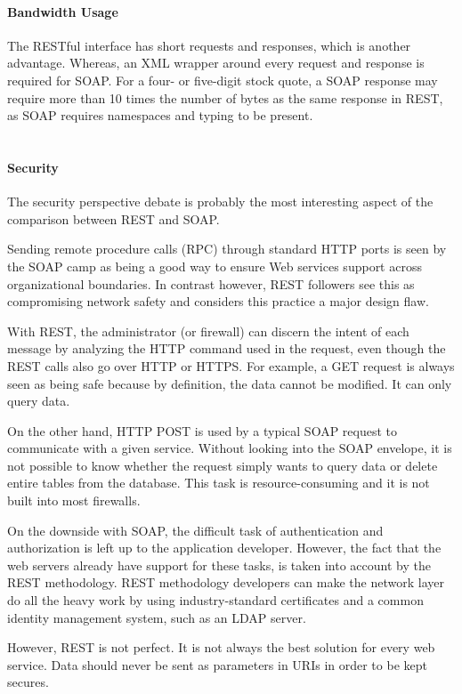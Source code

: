 \paragraph{Bandwidth Usage}

The RESTful interface has short requests and responses, which is another advantage. Whereas, an XML wrapper around every request and response is required for SOAP. For a four- or five-digit stock quote, a SOAP response may require more than 10 times the number of bytes as the same response in REST, as SOAP requires namespaces and typing to be present. 
\\
\\
\paragraph{Security}
The security perspective debate is probably the most interesting aspect of the comparison between REST and SOAP. 

Sending remote procedure calls (RPC) through standard HTTP ports is seen by the SOAP camp as being a good way to ensure Web services support across organizational boundaries. In contrast however, REST followers see this as compromising network safety and considers this practice a major design flaw.

With REST, the administrator (or firewall) can discern the intent of each message by analyzing the HTTP command used in the request, even though the REST calls also go over HTTP or HTTPS. For example, a GET request is always seen as being safe because by definition, the data cannot be modified. It can only query data.

On the other hand, HTTP POST is used by a typical SOAP request to communicate with a given service. Without looking into the SOAP envelope, it is not possible to know whether the request simply wants to query data or delete entire tables from the database. This task is resource-consuming and it is not built into most firewalls.

On the downside with SOAP, the difficult task of authentication and authorization is left up to the application developer. However, the fact that the web servers already have support for these tasks, is taken into account by the REST methodology. REST methodology developers can make the network layer do all the heavy work by using industry-standard certificates and a common identity management system, such as an LDAP server.

However, REST is not perfect. It is not always the best solution for every web service. Data should never be sent as parameters in URIs in order to be kept secures. 


